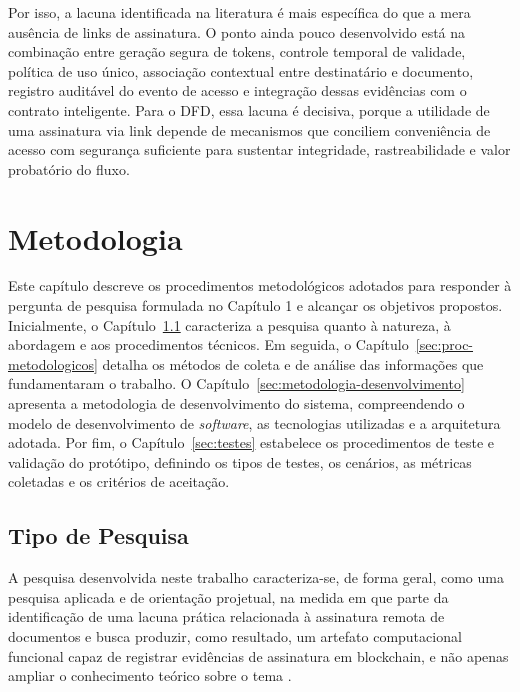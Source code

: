 \documentclass[
    12pt,
    a4paper,
    oneside,
    chapter=TITLE,
    section=TITLE,
    subsection=TITLE,
    subsubsection=TITLE,
    sumario=tradicional,
    english,
    brazil
]{abntex2}
\begin{document}
Por isso, a lacuna identificada na literatura é mais específica do
que a mera ausência de links de assinatura. O ponto ainda pouco
desenvolvido está na combinação entre geração segura de tokens,
controle temporal de validade, política de uso único, associação
contextual entre destinatário e documento, registro auditável do
evento de acesso e integração dessas evidências com o contrato
inteligente. Para o DFD, essa lacuna é decisiva, porque a utilidade de
uma assinatura via link depende de mecanismos que conciliem
conveniência de acesso com segurança suficiente para sustentar
integridade, rastreabilidade e valor probatório do fluxo.

\chapter{Metodologia}

Este capítulo descreve os procedimentos metodológicos adotados para
responder à pergunta de pesquisa formulada no Capítulo 1 e alcançar os
objetivos propostos. Inicialmente, o Capítulo~\ref{sec:tipo-pesquisa}
caracteriza a pesquisa quanto à natureza, à abordagem e aos
procedimentos técnicos. Em seguida, o Capítulo~\ref{sec:proc-metodologicos}
detalha os métodos de coleta e de análise das informações que
fundamentaram o trabalho. O Capítulo~\ref{sec:metodologia-desenvolvimento}
apresenta a metodologia de desenvolvimento do sistema, compreendendo
o modelo de desenvolvimento de \emph{software}, as tecnologias
utilizadas e a arquitetura adotada. Por fim, o
Capítulo~\ref{sec:testes} estabelece os procedimentos de teste e
validação do protótipo, definindo os tipos de testes, os cenários, as
métricas coletadas e os critérios de aceitação.

\section{Tipo de Pesquisa}
\label{sec:tipo-pesquisa}

A pesquisa desenvolvida neste trabalho caracteriza-se, de forma
geral, como uma pesquisa aplicada e de orientação projetual, na
medida em que parte da identificação de uma lacuna prática
relacionada à assinatura remota de documentos e busca produzir, como
resultado, um artefato computacional funcional capaz de registrar
evidências de assinatura em blockchain, e não apenas ampliar o
conhecimento teórico sobre o tema \cite{nakamoto2008, buterin2014,
szabo1997}.
\end{document}
